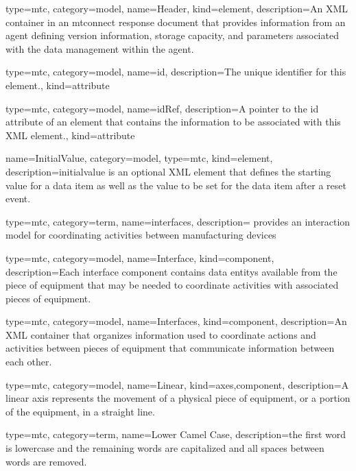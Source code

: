 {
  type=mtc,
  category=model,
  name={Header},
  kind={element},
  description={An XML container in an \gls{mtconnect response document} that provides information from an \gls{agent} defining version information, storage capacity, and parameters associated with the data management within the \gls{agent}.}
}


{
  type=mtc,
  category=model,
  name={id},
  description={The unique identifier for this element.},
  kind={attribute}
}

{
  type=mtc,
  category=model,
  name={idRef},
  description={A pointer to the \gls{id} attribute of an element that contains the information to be associated with this XML element.},
  kind={attribute}
}

{
  name={InitialValue},
  category=model,
  type=mtc,
  kind={element},
  description={\gls{initialvalue} is an optional XML element that defines the starting value for a data item as well as the value to be set for the data item after a reset event.}
}


{
  type=mtc,
  category=term,
  name={interfaces},
  description={ provides an interaction model for coordinating activities between manufacturing devices}
}


{
  type=mtc,
  category=model,
  name={Interface},
  kind={component},
  description={Each \gls{interface component} contains \glspl{data entity} available from the piece of equipment that may be needed to coordinate activities with associated pieces of equipment.}
}

{
  type=mtc,
  category=model,
  name={Interfaces},
  kind={component},
  description={An XML container that organizes information used to coordinate actions and activities between pieces of equipment that communicate information between each other. }
}


{
  type=mtc,
  category=model,
  name={Linear},
  kind={axes,component},
  description={A \gls{linear} axis represents the movement of a physical piece of equipment, or a portion of the equipment, in a straight line. }
}


{
  type=mtc,
  category=term,
  name={Lower Camel Case},
  description={the first word is lowercase and the remaining words are capitalized and all spaces between words are removed.}
}


